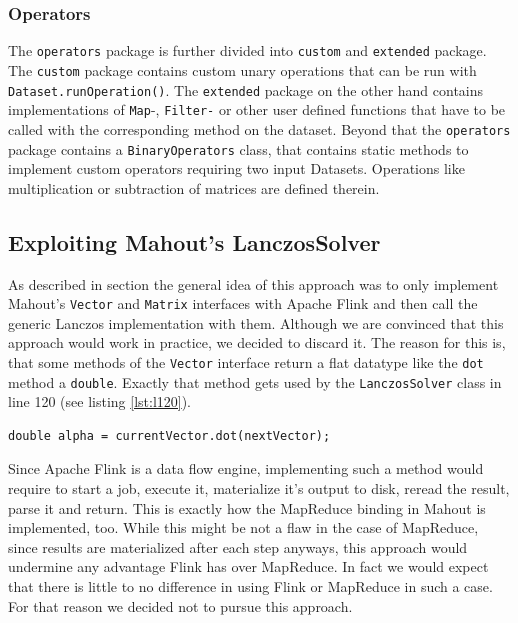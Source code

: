 \subsubsection{Operators}

The \texttt{operators} package is further divided into \texttt{custom} and \texttt{extended} package. The \texttt{custom} package contains custom unary operations that can be run with \texttt{Dataset.runOperation()}. The \texttt{extended} package on the other hand contains implementations of \texttt{Map}-, \texttt{Filter-} or other user defined functions that have to be called with the corresponding method on the dataset. Beyond that the \texttt{operators} package contains a \texttt{BinaryOperators} class, that contains static methods to implement custom operators requiring two input Datasets. Operations like multiplication or subtraction of matrices are defined therein.



\subsection{Exploiting Mahout's LanczosSolver}

As described in section \label{ssec:approach_mahout} the general idea of this
approach was to only implement Mahout's \texttt{Vector} and \texttt{Matrix}
interfaces with Apache Flink and then call the generic Lanczos implementation
with them. Although we are convinced that this approach would work in practice,
we decided to discard it. The reason for this is, that some methods of the
\texttt{Vector} interface return a flat datatype like the \texttt{dot} method a
\texttt{double}. Exactly that method gets used by the \texttt{LanczosSolver}
class in line 120 (see listing \ref{lst:l120}).
\begin{lstlisting}[label=lst:l120,captionpos=b,caption=Line 120 of the
\texttt{Lanczos} class]
double alpha = currentVector.dot(nextVector);	
\end{lstlisting}
Since Apache Flink is a data flow engine, implementing such a method would
require to start a job, execute it, materialize it's output to disk, reread the
result, parse it and return. This is exactly how the MapReduce binding in
Mahout is implemented, too. While this might be not a flaw in the case of
MapReduce, since results are materialized after each step anyways, this
approach would undermine any advantage Flink has over MapReduce. In fact we
would expect that there is little to no difference in using Flink or MapReduce
in such a case. For that reason we decided not to pursue this approach.


